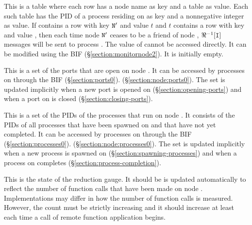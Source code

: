 \begin{Lentry}
\item[\T{monitored_nodes[\Z{N}]}]
This is a table where each row has a node name as key and a table as
value.  Each such table has the PID of a process residing on  as
key and a nonnegative integer as value.  If 
contains a row with key ${\tt{\sl N}}'$ and value $t$ and $t$ contains a row
with key  and value , then each time node ${\tt{\sl N}}'$ ceases
to be a friend of node , $\Re^{-1}[{\tt{\sl I}}]$ messages
 will be sent to process .
The value of  cannot be accessed directly.  It can be
modified using the BIF
 (\S\ref{section:monitornode2}).
It is initially empty.

\item[\T{ports[\Z{N}]}]
This is a set of the ports that are open on node .
It can be accessed by processes on  through the BIF
\ifOld {}
(\S\ref{section:ports0}).\fi
\ifStd {}
(\S\ref{section:node:ports0}).\fi
The set is updated implicitly when a
new port is opened on  (\S\ref{section:opening-ports})
and when a port on  is closed (\S\ref{section:closing-ports}).

\item[\T{processes[\Z{N}]}]
This is a set of the PIDs of the processes that run on node .
It consists of the PIDs of all processes that have been spawned on
 and that have not yet completed.
It can be accessed by processes on  through the BIF
\ifOld {}
(\S\ref{section:processes0}).\fi
\ifStd {}
(\S\ref{section:node:processes0}).\fi
The set is updated implicitly when a
new process is spawned on  (\S\ref{section:spawning-processes})
and when a process on  completes (\S\ref{section:process-completion}).

\item[\T{reductions[\Z{N}]}]
This is the state of the reduction gauge.  It
\ifStd should be \fi \ifOld is \fi
updated automatically to reflect the
number of function calls that have been made on node .
\ifStd
Implementations may
differ in how the number of function calls is measured.  However, the count must
be strictly increasing and it should increase at least
each time a call of remote function application begins.
\fi


\end{Lentry}
